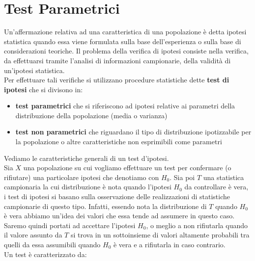 \documentclass[a4paper,12pt, oneside]{book}
\begin{document}
\chapter{Test Parametrici}
Un’affermazione relativa ad una caratteristica di una popolazione è detta ipotesi statistica quando essa viene formulata sulla base dell’esperienza o sulla base di
considerazioni teoriche.
Il problema della verifica di ipotesi consiste nella verifica, da effettuarsi tramite
l’analisi di informazioni campionarie, della validità di un’ipotesi statistica.\\
Per effettuare tali verifiche si utilizzano procedure statistiche dette \textbf{test di ipotesi} che si divisono in:
\begin{itemize}
\item \textbf{test parametrici} che si riferiscono ad ipotesi relative ai parametri della
distribuzione della popolazione (media o varianza)
\item \textbf{test non parametrici} che riguardano il tipo di distribuzione ipotizzabile per la
popolazione o altre caratteristiche non esprimibili come
parametri
\end{itemize}
Vediamo le caratteristiche generali di un test d'ipotesi.\\
Sia $X$ una popolazione su cui vogliamo effettuare un test per confermare (o
rifiutare) una particolare ipotesi che denotiamo con $H_0$.
Sia poi $T$ una statistica campionaria la cui distribuzione è nota quando l’ipotesi $H_0$
da controllare è vera, i test di ipotesi si basano sulla osservazione delle
realizzazioni di statistiche campionarie di questo tipo. Infatti, essendo nota la distribuzione di $T$ quando $H_0$ è vera abbiamo un’idea dei
valori che essa tende ad assumere in questo caso. Saremo quindi portati ad
accettare l’ipotesi $H_0$, o meglio a non rifiutarla quando il valore assunto da $T$
si trova in un sottoinsieme di valori altamente probabili tra quelli da essa assumibili
quando $H_0$ è vera e a rifiutarla in caso contrario.\\
Un test è caratterizzato da:
\end{document}
